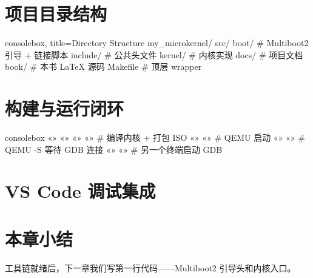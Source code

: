\section{项目目录结构}

\begin{tcblisting}{consolebox, title={Directory Structure}}
my_microkernel/
  src/
    boot/          # Multiboot2 引导 + 链接脚本
    include/       # 公共头文件
    kernel/        # 内核实现
  docs/            # 项目文档
  book/            # 本书 LaTeX 源码
  Makefile         # 顶层 wrapper
\end{tcblisting}

\section{构建与运行闭环}


\begin{tcblisting}{consolebox}
«\tps{\$}» «»
«\tps{\$}» «»        # 编译内核 + 打包 ISO
«\tps{\$}» «»        # QEMU 启动
«\tps{\$}» «»      # QEMU -S 等待 GDB 连接
«\tps{\$}» «»        # 另一个终端启动 GDB
\end{tcblisting}

\section{VS Code 调试集成}


\section{本章小结}

工具链就绪后，下一章我们写第一行代码——Multiboot2 引导头和内核入口。
